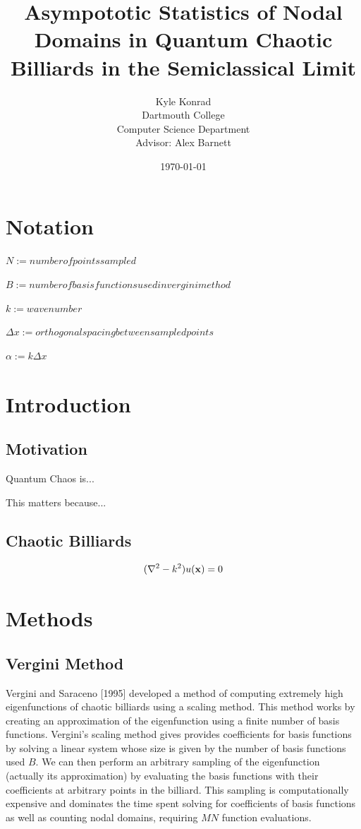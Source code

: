 \documentclass{article}
\begin{document}
\title{Asympototic Statistics of Nodal Domains in Quantum Chaotic Billiards in the Semiclassical Limit}
\author{Kyle Konrad\\
  Dartmouth College\\
  Computer Science Department\\
  Advisor: Alex Barnett}
\date{\today}


\section*{Notation}
$N := number of points sampled$

$B := number of basis functions used in vergini method$

$k := wavenumber$

$\Delta x := orthogonal spacing between sampled points$

$\alpha := k \Delta x$

\section*{Introduction}
\subsection*{Motivation}
Quantum Chaos is...

This matters because...

\subsection*{Chaotic Billiards}
\begin{equation}
\label{eq:helmholtz}
(\nabla^{2} - k^{2})u({\bf x}) = 0
\end{equation}


\section*{Methods}
\subsection*{Vergini Method}
Vergini and Saraceno [1995] developed a method of computing extremely high eigenfunctions of chaotic billiards using a scaling method. This method works by creating an approximation of the eigenfunction using a finite number of basis functions. Vergini's scaling method gives provides coefficients for basis functions by solving a linear system whose size is given by the number of basis functions used $B$. We can then perform an arbitrary sampling of the eigenfunction (actually its approximation) by evaluating the basis functions with their coefficients at arbitrary points in the billiard. This sampling is computationally expensive and dominates the time spent solving for coefficients of basis functions as well as counting nodal domains, requiring $M N$ function evaluations.
\end{document}
